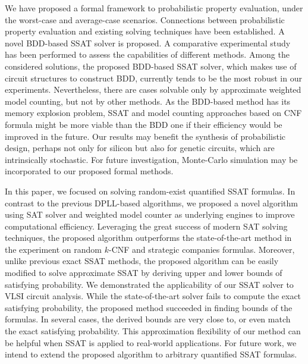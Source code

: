 \iffalse
    We have proposed a formal framework to probabilistic property
    evaluation, under the worst-case and average-case scenarios.
    Connections between probabilistic property evaluation and existing
    solving techniques have been established. A novel BDD-based SSAT solver is proposed. A comparative experimental study has been performed to assess the capabilities
    of different methods. Among the considered solutions, the proposed BDD-based SSAT solver, which makes use of circuit structures to construct BDD, currently tends to be the most robust in our experiments. Nevertheless, there are cases solvable only by approximate weighted model counting, but not by other methods. As the BDD-based method has its memory explosion problem, SSAT and model
    counting approaches based on CNF formula might be more viable than the BDD one if their efficiency would be improved in the future. Our results may benefit the synthesis of probabilistic design, perhaps not only for silicon but also for genetic circuits, which are intrinsically stochastic. For future investigation, Monte-Carlo simulation may be incorporated to our proposed formal methods.

    In this paper, we focused on solving random-exist quantified SSAT formulas.
    In contrast to the previous DPLL-based algorithms, we proposed a novel algorithm using SAT solver and weighted model counter as underlying engines to improve computational efficiency.
    Leveraging the great success of modern SAT solving techniques, the proposed algorithm outperforms the state-of-the-art method in the experiment on random $k$-CNF and strategic companies formulas.
    Moreover, unlike previous exact SSAT methods, the proposed algorithm can be easily modified to solve approximate SSAT by deriving upper and lower bounds of satisfying probability.
    We demonstrated the applicability of our SSAT solver to VLSI circuit analysis.
    While the state-of-the-art solver fails to compute the exact satisfying probability, the proposed method succeeded in finding bounds of the formulas.
    In several cases, the derived bounds are very close to, or even match the exact satisfying probability.
    This approximation flexibility of our method can be helpful when SSAT is applied to real-world applications.
    For future work, we intend to extend the proposed algorithm to arbitrary quantified SSAT formulas.

